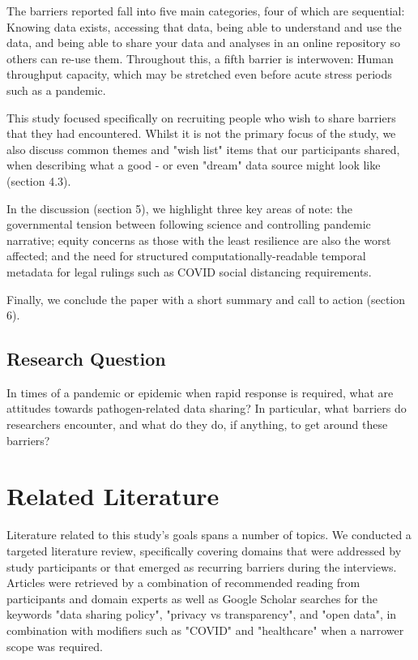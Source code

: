 \documentclass{CUP-JNL-DAP}%
\begin{document}
The barriers reported fall into five main categories, four of which are sequential: Knowing data exists, accessing that data, being able to understand and use the data, and being able to share your data and analyses in an online repository so others can re-use them. Throughout this, a fifth barrier is interwoven: Human throughput capacity, which may be stretched even before acute stress periods such as a pandemic.

This study focused specifically on recruiting people who wish to share barriers that they had encountered. Whilst it is not the primary focus of the study, we also discuss common themes and "wish list" items that our participants shared, when describing what a good - or even "dream" data source might look like (section 4.3).

In the discussion (section 5), we highlight three key areas of note: the governmental tension between following science and controlling pandemic narrative; equity concerns as those with the least resilience are also the worst affected; and the need for structured computationally-readable temporal metadata for legal rulings such as COVID social distancing requirements. 

Finally, we conclude the paper with a short summary and call to action (section 6). 

\subsection{Research Question}
In times of a pandemic or epidemic when rapid response is required, what are attitudes towards pathogen-related data sharing? In particular, what barriers do researchers encounter, and what do they do, if anything, to get around these barriers? 

\section{Related Literature}

Literature related to this study's goals spans a number of topics. We conducted a targeted literature review, specifically covering domains that were addressed by study participants or that emerged as recurring barriers during the interviews. Articles were retrieved by a combination of recommended reading from participants and domain experts as well as Google Scholar searches for the keywords "data sharing policy", "privacy vs transparency", and "open data", in combination with modifiers such as "COVID" and "healthcare" when a narrower scope was required.
\end{document}
